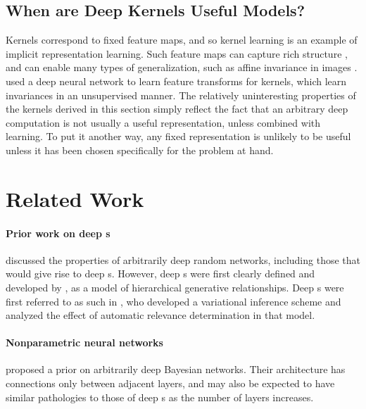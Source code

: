 \subsection{When are Deep Kernels Useful Models?}

Kernels correspond to fixed feature maps, and so kernel learning is an example of implicit representation learning. %
Such feature maps can capture rich structure \citep{DuvLloGroetal13}, and can enable many types of generalization, such as affine invariance in images \citep{kondor2008group}.
\cite{salakhutdinov2008using} used a deep neural network to learn feature transforms for kernels, which learn invariances in an unsupervised manner.
The relatively uninteresting properties of the kernels derived in this section simply reflect the fact that an arbitrary deep computation is not usually a useful representation, unless combined with learning.
To put it another way, any fixed representation is unlikely to be useful unless it has been chosen specifically for the problem at hand.






\section{Related Work}

\paragraph{Prior work on deep \sgp{}s}
\citet{neal1995bayesian} discussed the properties of arbitrarily deep random networks, including those that would give rise to deep \gp{}s.
However, deep \gp{}s were first clearly defined and developed by \cite{lawrence2007hierarchical}, as a model of hierarchical generative relationships.
Deep \gp{}s were first referred to as such in \citet{damianou2012deep}, who developed a variational inference scheme and analyzed the effect of automatic relevance determination in that model.

\paragraph{Nonparametric neural networks}
\citet{adams2010learning} proposed a prior on arbitrarily deep Bayesian networks.
Their architecture has connections only between adjacent layers, and may also be expected to have similar pathologies to those of deep \gp{}s as the number of layers increases.

